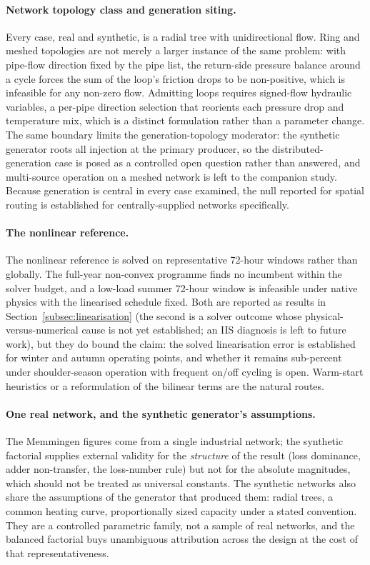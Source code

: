 \documentclass[a4paper,fleqn]{cas-sc}
\begin{document}
\paragraph{Network topology class and generation siting.}
Every case, real and synthetic, is a radial tree with unidirectional flow. Ring and meshed
topologies are not merely a larger instance of the same problem: with pipe-flow direction
fixed by the pipe list, the return-side pressure balance around a cycle forces the sum of
the loop's friction drops to be non-positive, which is infeasible for any non-zero flow.
Admitting loops requires signed-flow hydraulic variables, a per-pipe direction selection
that reorients each pressure drop and temperature mix, which is a distinct formulation
rather than a parameter change. The same boundary limits the generation-topology
moderator: the synthetic generator roots all injection at the primary producer, so the
distributed-generation case is posed as a controlled open question rather than answered,
and multi-source operation on a meshed network is left to the companion study. Because
generation is central in every case examined, the null reported for spatial routing is
established for centrally-supplied networks specifically.

\paragraph{The nonlinear reference.}
The nonlinear reference is solved on representative 72-hour windows rather than globally. The
full-year non-convex programme finds no incumbent within the solver budget, and a low-load
summer 72-hour window is infeasible under native physics with the linearised schedule fixed. Both
are reported as results in Section~\ref{subsec:linearisation} (the second is a solver outcome
whose physical-versus-numerical cause is not yet established; an IIS diagnosis is left to future
work), but they do bound the claim: the solved linearisation error is established for winter
and autumn operating points, and whether it remains sub-percent under shoulder-season
operation with frequent on/off cycling is open. Warm-start heuristics or a reformulation
of the bilinear terms are the natural routes.

\paragraph{One real network, and the synthetic generator's assumptions.}
The Memmingen figures come from a single industrial network; the synthetic factorial
supplies external validity for the \emph{structure} of the result (loss dominance,
adder non-transfer, the loss-number rule) but not for the absolute magnitudes, which
should not be treated as universal constants. The synthetic networks also share the
assumptions of the generator that produced them: radial trees, a common heating curve,
proportionally sized capacity under a stated convention. They are a controlled parametric
family, not a sample of real networks, and the balanced factorial buys unambiguous
attribution across the design at the cost of that representativeness.
\end{document}
